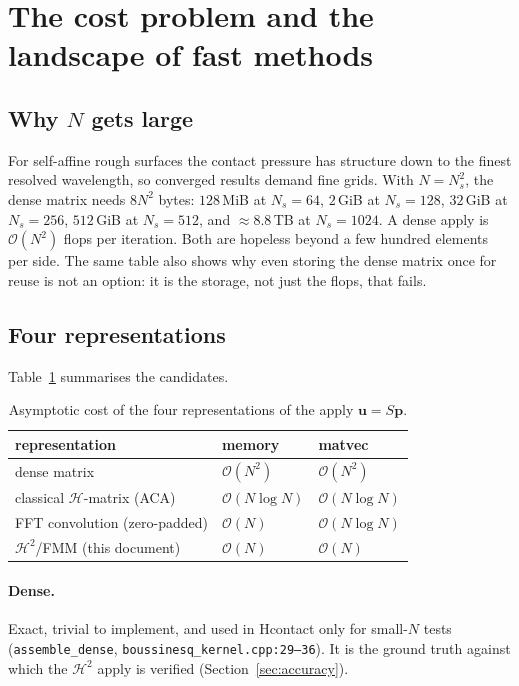 \documentclass[11pt,a4paper]{article}
\newcommand{\Order}{\mathcal{O}}
\newcommand{\pp}{\mathbf{p}}
\newcommand{\Htwo}{\mathcal{H}^2}
\newcommand{\Hmat}{\mathcal{H}}
\newcommand{\code}[1]{\texttt{#1}}
\theoremstyle{definition}
\theoremstyle{remark}
\begin{document}
\section{The cost problem and the landscape of fast methods}
\label{sec:cost}

\subsection{Why $N$ gets large}

For self-affine rough surfaces the contact pressure has structure down to the
finest resolved wavelength, so converged results demand fine grids. With
$N=N_s^2$, the dense matrix needs $8N^2$ bytes: $128$\,MiB at $N_s=64$,
$2$\,GiB at $N_s=128$, $32$\,GiB at $N_s=256$, $512$\,GiB at $N_s=512$, and
$\approx 8.8$\,TB at $N_s=1024$. A dense apply is $\Order(N^2)$ flops per
iteration. Both are hopeless beyond a few hundred elements per side. The same
table also shows why even storing the dense matrix once for reuse is not an
option: it is the storage, not just the flops, that fails.

\subsection{Four representations}

Table~\ref{tab:landscape} summarises the candidates.

\begin{table}[h]
\centering
\begin{tabular}{lll}
\toprule
representation & memory & matvec \\
\midrule
dense matrix                       & $\Order(N^2)$       & $\Order(N^2)$ \\
classical $\Hmat$-matrix (ACA)     & $\Order(N\log N)$   & $\Order(N\log N)$ \\
FFT convolution (zero-padded)      & $\Order(N)$         & $\Order(N\log N)$ \\
$\Htwo$/FMM (this document)        & $\Order(N)$         & $\Order(N)$ \\
\bottomrule
\end{tabular}
\caption{Asymptotic cost of the four representations of the apply $\mathbf u=S\pp$.}
\label{tab:landscape}
\end{table}

\paragraph{Dense.} Exact, trivial to implement, and used in Hcontact only for
small-$N$ tests (\code{assemble\_dense}, \code{boussinesq\_kernel.cpp:29--36}). It
is the ground truth against which the $\Htwo$ apply is verified
(Section~\ref{sec:accuracy}).
\end{document}
